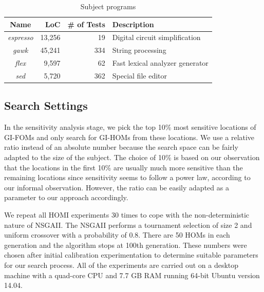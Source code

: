 \documentclass[oribibl]{llncs}
\begin{document}
\begin{table}[!ht]
\centering
\caption{Subject programs}
\label{tab_subject}
\begin{tabular}{crrl}
\hline
Name & LoC & \# of Tests & Description \\
\hline
\emph{espresso} & 13,256 & 19 & Digital circuit simplification\\
\emph{gawk} & 45,241 & 334 & String processing\\
\emph{flex} & 9,597 & 62 & Fast lexical analyzer generator\\
\emph{sed} & 5,720 & 362 & Special file editor\\
\hline
\end{tabular}%
\end{table}




%


\vspace{-3mm}
\subsection{Search Settings}
\label{sec_searchsetting}


In the sensitivity analysis stage, we pick the top 10\% most sensitive locations of GI-FOMs and only search for GI-HOMs from these locations. We use a relative ratio instead of an absolute number because the search space can be fairly adapted to the size of the subject. The choice of 10\% is based on our observation that the locations in the first 10\% are usually much more sensitive than the remaining locations since sensitivity seems to follow a power law, according to our informal observation. However, the ratio can be easily adapted as a parameter to our approach accordingly.


We repeat all HOMI experiments 30 times to cope with the non-deterministic nature of NSGAII. The NSGAII performs a tournament selection of size 2 and uniform crossover with a probability of 0.8. There are 50 HOMs in each generation and the algorithm stops at 100th generation. These numbers were chosen after initial calibration experimentation to determine suitable parameters for our search process. All of the experiments are carried out on a desktop machine with a quad-core CPU and 7.7 GB RAM running 64-bit Ubuntu version 14.04.
\end{document}
